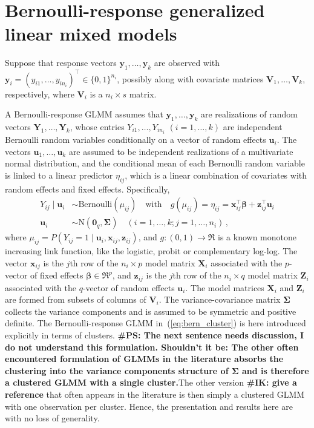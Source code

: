 \documentclass[11pt, a4paper]{article}
\newcommand*{\bb}{\boldsymbol}
\newcommand{\IK}[1]{{\noindent \color{blue} \bf \#IK: #1}}
\newcommand{\PS}[1]{{\noindent \color{red} \bf \#PS: #1}}
\theoremstyle{example} \newtheorem{example}{Example}[section]
\theoremstyle{theorem} \newtheorem{theorem}{Theorem}[section]
\def\bbeta{\bb{\beta}}
\def\bSigma{\bb{\Sigma}}
\def\by{\bb{y}}
\def\bY{\bb{Y}}
\def\bu{\bb{u}}
\def\bx{\bb{x}}
\def\bz{\bb{z}}
\def\b0{\bb{0}}
\def\bX{\bb{X}}
\def\bZ{\bb{Z}}
\def\bV{\bb{V}}
\def\bY{\bb{Y}}
\def\by{\bb{y}}
\begin{document}
\section{Bernoulli-response generalized linear mixed models}
\label{sec:bern_GLMMs}

Suppose that response vectors $\by_1, \ldots, \by_k$ are observed with
$\by_i = (y_{i1}, \ldots, y_{in_i})^\top \in \{0, 1\}^{n_i}$, possibly
along with covariate matrices $\bV_1, \ldots, \bV_k$, respectively,
where $\bV_i$ is a $n_i \times s$ matrix.

A Bernoulli-response GLMM assumes that $\by_1, \ldots, \by_k$
are realizations of random vectors $\bY_1, \ldots, \bY_k$, whose entries
$Y_{i1}, \ldots, Y_{in_i}$ $(i = 1, \ldots, k)$ are independent
Bernoulli random variables conditionally on a vector of random effects
$\bu_i$. The vectors $\bu_1, \ldots, \bu_k$ are assumed to be
independent realizations of a multivariate normal distribution, and the conditional mean of each Bernoulli random
variable is linked to a linear predictor $\eta_{ij}$, which is a
linear combination of covariates with random effects and fixed effects.
Specifically,
\begin{align}
\label{eq:bern_cluster}
  Y_{ij} \mid \bb{u}_i & \sim \text{Bernoulli}(\mu_{ij}) \quad \text{with} \quad
  g(\mu_{ij}) = \eta_{ij} = \bx_{ij}^\top \bbeta + \bz_{ij}^\top \bu_i\\
  \bu_i & \sim \text{N}(\b0_q, \bb{\Sigma})  \quad (i = 1, \ldots, k; j = 1, \ldots, n_i)\,,
\end{align}
where $\mu_{ij} = P(Y_{ij} = 1 \mid \bu_i, \bx_{ij}, \bz_{ij})$, and
$g: (0, 1) \to \Re$ is a known monotone increasing link function, like
the logistic, probit or complementary log-log. The vector $\bx_{ij}$
is the $j$th row of the $n_i \times p$ model matrix $\bX_{i}$
associated with the $p$-vector of fixed effects
$\bbeta \in \Re^p$, and $\bz_{ij}$ is the $j$th row of the
$n_i \times q$ model matrix $\bZ_{i}$ associated with the $q$-vector
of random effects $\bu_i$. The model matrices $\bX_i$ and $\bZ_i$ are
formed from subsets of columns of $\bV_i$. The variance-covariance
matrix $\bSigma$ collects the variance components and is assumed to be
symmetric and positive definite. The Bernoulli-response GLMM
in~(\ref{eq:bern_cluster}) is here introduced explicitly in terms of
clusters. \PS{The next sentence needs discussion, I do not understand this formulation. Shouldn't it be: The other often encountered formulation of GLMMs in the literature \citep[Chapter 7.4]{mcculloch+etal:2008} absorbs the clustering into the variance components structure of $\bSigma$ and is therefore a clustered GLMM with a single cluster.}The other version \IK{give a reference} that often appears
in the literature is then simply a clustered GLMM with one observation
per cluster. Hence, the presentation and results here are with no loss
of generality.
\end{document}
